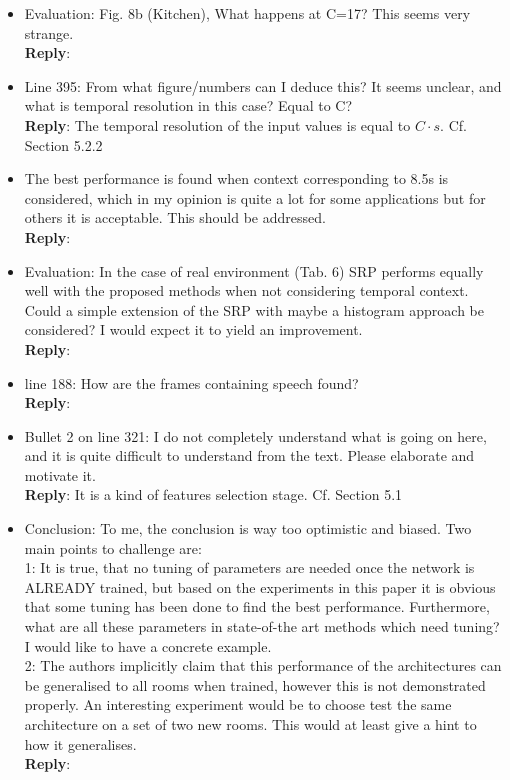 \documentclass[11pt, technote, letterpaper, oneside, onecolumn]{IEEEtran}
\begin{document}
\begin{itemize}
\item Evaluation: Fig. 8b (Kitchen), What happens at C=17? This seems very strange.\\
\textbf{Reply}:

\item Line 395: From what figure/numbers can I deduce this? It seems unclear, and what is temporal resolution in this case? Equal to C?\\
\textbf{Reply}: The temporal resolution of the input values is equal to $C\cdot s$. Cf. Section 5.2.2 

\item The best performance is found when context corresponding to 8.5s is considered, which in my opinion is quite a lot for some applications but for others it is acceptable. This should be addressed.\\
\textbf{Reply}:

\item Evaluation: In the case of real environment (Tab. 6) SRP performs equally well with the proposed methods when not considering temporal context. Could a simple extension of the SRP with maybe a histogram approach be considered? I would expect it to yield an improvement.\\
\textbf{Reply}:

\item line 188: How are the frames containing speech found?\\
\textbf{Reply}:

\item Bullet 2 on line 321: I do not completely understand what is going on here, and it is quite difficult to understand from the text. Please elaborate and motivate it.\\
\textbf{Reply}: It is a kind of features selection stage. Cf. Section 5.1 

\item Conclusion: To me, the conclusion is way too optimistic and biased. Two main points to challenge are:\\
 1: It is true, that no tuning of parameters are needed once the network is ALREADY trained, but based on the experiments in this paper it is obvious that some tuning has been done to find the best performance. Furthermore, what are all these parameters in state-of-the art methods which need tuning? I would like to have a concrete example.\\
 2: The authors implicitly claim that this performance of the architectures can be generalised to all rooms when trained, however this is not demonstrated properly. An interesting experiment would be to choose test the same architecture on a set of two new rooms. This would at least give a hint to how it generalises.\\
 \textbf{Reply}:


\end{itemize}
\end{document}

